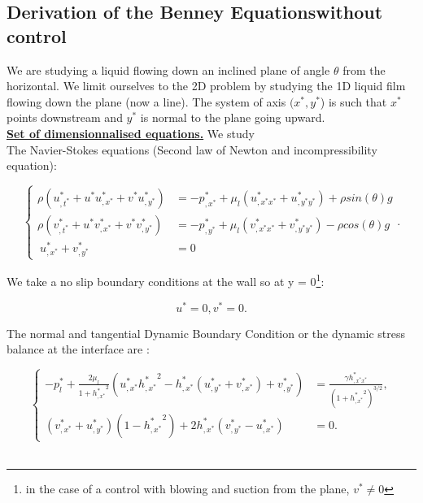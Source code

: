 \documentclass[12pt]{article}
\begin{document}
\subsection{Derivation of the Benney Equationswithout control}

We are studying a liquid flowing down an inclined plane of angle $\theta$ from the horizontal. We limit ourselves to 
the 2D problem by studying the 1D liquid film flowing down the plane (now a line). 
The system of axis $(x^*, y^*$) is such that $x^*$ points downstream and $y^*$ is normal to the plane going upward. 
\\

\vspace{0.5cm}
{\underline{\textbf{Set of dimensionnalised equations.}}}
We study\\ 

The Navier-Stokes equations (Second law of Newton and incompressibility equation):

\begin{equation}
\left\{
\begin{aligned}
    \rho(u^*_{,t^*}+u^*u^*_{,x^*}+v^*u^*_{,y^*}) &= -p^*_{,x^*} + \mu_l(u^*_{,x^*x^*} + u^*_{,y^*y^*}) + \rho sin(\theta)g\\
    \rho(v^*_{,t^*}+u^*v^*_{,x^*}+v^*v^*_{,y^*}) &= -p^*_{,y^*} + \mu_l(v^*_{,x^*x^*} + v^*_{,y^*y^*}) - \rho cos(\theta)g\\\
    u^*_{,x^*} + v^*_{,y^*} &= 0 \quad 
\end{aligned}
\right. .
\end{equation}

We take a no slip boundary conditions at the wall so at y = 0\footnote{in the case of a control with blowing and suction from the plane, $v^*\neq 0$ }: 

\begin{equation}
    u^*=0, v^*=0.
\end{equation} 

The normal and tangential Dynamic Boundary Condition or the dynamic stress balance at the interface are : 

\begin{equation}
\left\{
\begin{aligned}
-p^*_l + \frac{2\mu_l}{1+{h^*_{,x^*}}^2}(u^*_{,x^*}{h^*_{,x^*}}^2 - h^*_{,x^*}(u^*_{,y^*} + v^*_{,x^*})+v^*_{,y^*}) &= \frac{\gamma h^*_{,x^*x^*}}{(1+{h^*_{,x^*}}^2)^{3/2}},\\
(v^*_{,x^*} + u^*_{,y^*})(1-{h^*_{,x^*}}^2)+2h^*_{,x^*}(v^*_{,y^*}-u^*_{,x^*})&=0.
\end{aligned}
\right.
\end{equation}
\\
\end{document}
